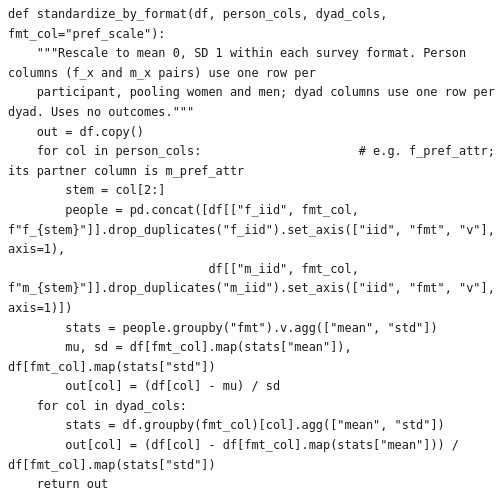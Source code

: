 \documentclass[11pt]{article}
\begin{document}
\begin{lstlisting}[caption={Survey-format standardization (scripts/modeling.py)}]
def standardize_by_format(df, person_cols, dyad_cols, fmt_col="pref_scale"):
    """Rescale to mean 0, SD 1 within each survey format. Person columns (f_x and m_x pairs) use one row per
    participant, pooling women and men; dyad columns use one row per dyad. Uses no outcomes."""
    out = df.copy()
    for col in person_cols:                      # e.g. f_pref_attr; its partner column is m_pref_attr
        stem = col[2:]
        people = pd.concat([df[["f_iid", fmt_col, f"f_{stem}"]].drop_duplicates("f_iid").set_axis(["iid", "fmt", "v"], axis=1),
                            df[["m_iid", fmt_col, f"m_{stem}"]].drop_duplicates("m_iid").set_axis(["iid", "fmt", "v"], axis=1)])
        stats = people.groupby("fmt").v.agg(["mean", "std"])
        mu, sd = df[fmt_col].map(stats["mean"]), df[fmt_col].map(stats["std"])
        out[col] = (df[col] - mu) / sd
    for col in dyad_cols:
        stats = df.groupby(fmt_col)[col].agg(["mean", "std"])
        out[col] = (df[col] - df[fmt_col].map(stats["mean"])) / df[fmt_col].map(stats["std"])
    return out
\end{lstlisting}
\end{document}
